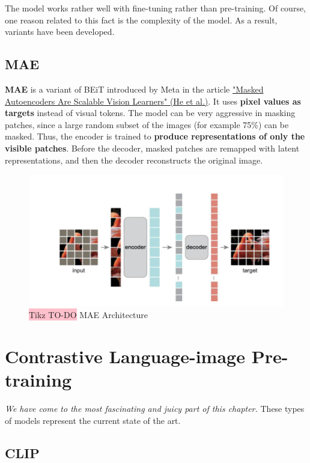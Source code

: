 The model works rather well with fine-tuning rather than pre-training. Of course, one reason related to this fact is the complexity of the model. As a result, variants have been developed.

\subsection{MAE}

\textbf{MAE} is a variant of BEiT introduced by Meta in the article \href{https://arxiv.org/pdf/2111.06377}{"Masked Autoencoders Are Scalable Vision Learners" (He et al.)}. It uses \textbf{pixel values as targets} instead of visual tokens. The model can be very aggressive in masking patches, since a large random subset of the images (for example 75\%) can be masked. Thus, the encoder is trained to \textbf{produce representations of only the visible patches}. Before the decoder, masked patches are remapped with latent representations, and then the decoder reconstructs the original image.

\begin{figure}[!htbp]
    \centering
    \includegraphics[width=\linewidth]{tikz/chapter11 - MAE.png}
    \caption{{\color{red}\colorbox{pink}{Tikz TO-DO}} MAE Architecture}
\end{figure}


\section{Contrastive Language-image Pre-training}

\textit{We have come to the most fascinating and juicy part of this chapter.} These types of models represent the current state of the art. 

\subsection{CLIP}

